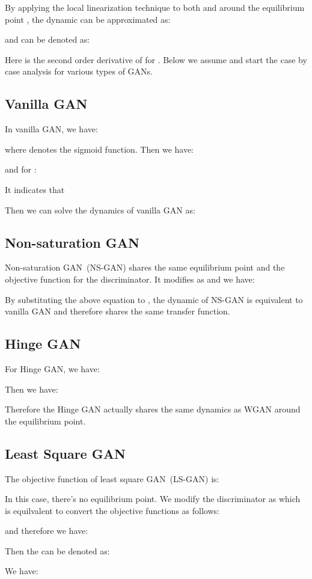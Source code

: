 \documentclass{article}
\theoremstyle{definition}
\begin{document}
By applying the local linearization technique to both  and  around the equilibrium point , the dynamic can be approximated as:

and  can be denoted as:

Here  is the second order derivative of  for .
Below we assume  and start the case by case analysis for various types of GANs.

\subsection{Vanilla GAN}
In vanilla GAN, we have:

where  denotes the sigmoid function.
Then we have:

and for :

It indicates that 

Then we can solve the dynamics of vanilla GAN as:


\subsection{Non-saturation GAN}
Non-saturation GAN~(NS-GAN) shares the same equilibrium point and the objective function for the discriminator. It modifies  as  and we have:

By substituting the above equation to , the dynamic of NS-GAN is equivalent to vanilla GAN and therefore shares the same transfer function.

\subsection{Hinge GAN}
For Hinge GAN, we have:

Then we have:

Therefore the Hinge GAN actually shares the same dynamics as WGAN around the equilibrium point.

\subsection{Least Square GAN}

The objective function of least square GAN~(LS-GAN) is:

In this case, there's no equilibrium point. We modify the discriminator as  which is equilvalent to convert the objective functions as follows: 

and therefore we have:

Then the  can be denoted as:

We have:
\end{document}
